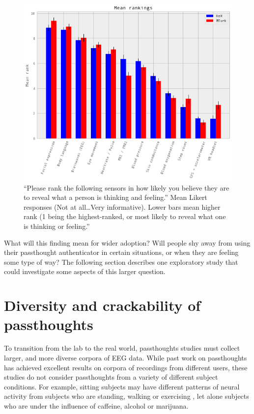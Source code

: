 \documentclass[sigconf]{acmart}
\begin{document}
\label{fig:rank}
\begin{figure}
\centering
\includegraphics[width=.9\linewidth]{./figures/rankings.png}
\caption{``Please rank the following sensors in how likely you believe they are to reveal what a person is thinking and feeling.'' Mean Likert responses (Not at all\ldots{}Very informative). Lower bars mean higher rank (1 being the highest-ranked,  or most likely to reveal what one is thinking or feeling.''}
\end{figure}

What will this finding mean for wider adoption? 
Will people shy away from using their passthought authenticator in certain situations, or when they are feeling some type of way?
The following section describes one exploratory study that could investigate some aspects of this larger question.

\section{Diversity and crackability of passthoughts}
\label{sec:orgba47d6a}

To transition from the lab to the real world,
passthoughts studies must collect larger, and more diverse corpora of EEG data.
While past work on passthoughts has achieved excellent results on corpora of recordings from different users, 
these studies do not consider passthoughts from a variety of different subject conditions.
For example, sitting subjects may have different patterns of neural activity from subjects who are standing, walking or exercising \cite{Thibault2016a},
let alone subjects who are under the influence of caffeine, alcohol or marijuana.
\end{document}
